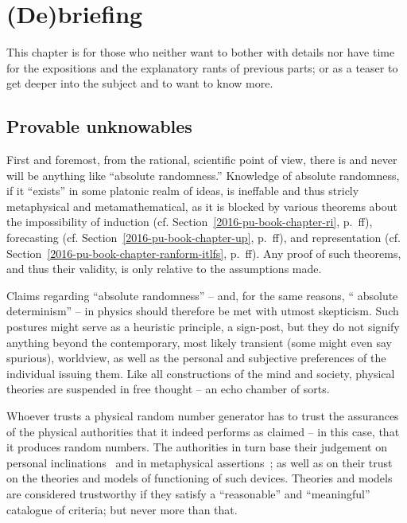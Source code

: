 %
%
%

\chapter{(De)briefing}
\label{2016-pu-book-chapter-es} %

This chapter is for those who neither want to bother with details nor have time
for the expositions and the explanatory rants of previous parts;
or as a teaser to get deeper into the subject and to want to know more.

\section{Provable unknowables}

First and foremost, from the rational, scientific point of view, there is and never will be anything like ``absolute randomness.''
Knowledge of absolute randomness, if it ``exists'' in some platonic realm of ideas,
is ineffable and thus stricly metaphysical and metamathematical,  as it is blocked  by various theorems
about the impossibility of induction (cf. Section~\ref{2016-pu-book-chapter-ri}, p.~\pageref{2016-pu-book-chapter-ri}ff),
forecasting (cf. Section~\ref{2016-pu-book-chapter-up}, p.~\pageref{2016-pu-book-chapter-up}ff),
and representation (cf. Section~\ref{2016-pu-book-chapter-ranform-itlfs}, p.~\pageref{2016-pu-book-chapter-ranform-itlfs}ff).
Any proof of such theorems, and thus their validity, is only relative to the assumptions made.

Claims regarding ``absolute randomness'' -- and, for the same reasons, `` absolute determinism'' --
in physics should therefore be met with utmost skepticism.
Such postures might serve as a heuristic principle, a sign-post, but they do not signify anything beyond the
contemporary, most likely transient (some might even say spurious), worldview, as well as the
personal and subjective preferences of the individual issuing them.
Like all constructions of the mind and society, physical theories are suspended in free thought
--  an  echo chamber of sorts.

Whoever trusts a physical random number generator has to trust the assurances of the physical authorities that it indeed
performs as claimed --
in this case, that it produces random numbers.
The authorities in turn base their judgement
on personal inclinations~\cite[p.~866]{born-26-1}
and in metaphysical assertions~\cite{zeil-05_nature_ofQuantum}; as well as on
their trust on the  theories and models of functioning of such  devices.
Theories and models are considered trustworthy if they satisfy a ``reasonable'' and ``meaningful'' catalogue of criteria;
but never more than that.


